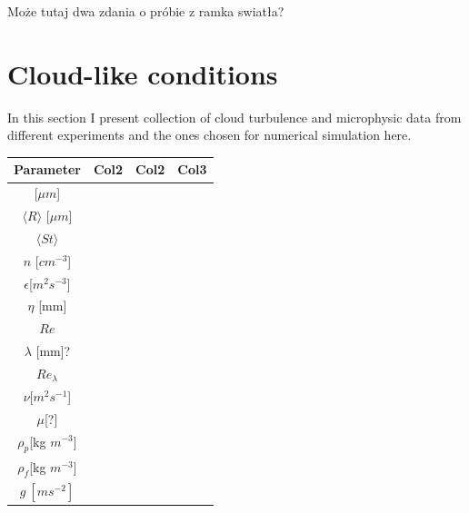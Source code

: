 \documentclass[../main.tex]{subfiles}
\begin{document}
Może tutaj dwa zdania o próbie z ramka swiatła?

\section{Cloud-like conditions}
\label{ch2s5}

In this section I present collection of cloud turbulence and microphysic data from different experiments and the ones chosen for numerical simulation here.

\begin{table}[h!]
\centering
 \begin{tabular}{||c| c| c| c||} 
 \hline
 Parameter & Col2 \citep{} & Col2\citep{} & Col3\citep{} \\ [0.5ex] 
 \hline\hline
  [$R_{min},R_{max}$][$\mu m$] &  &  &  \\ 
  $\langle R \rangle$ [$\mu m$]&  &  &  \\
  $\langle St\rangle$ &  &  &  \\
  $n$ [$cm^{-3}$] &  &  &  \\
  $\epsilon$[$m^2 s^{-3}$] &  &  &  \\
  $\eta$ [mm] &  &  &  \\
  $Re$ &  &  &  \\
  $\lambda$ [mm]? &  &  &  \\
  $Re_{\lambda}$        &  &  &  \\
  $\nu$[$m^2 s^{-1}$] &  &  &  \\
  $\mu$[?] &  &  &  \\
  $\rho_p$[kg $m^{-3}$] &  &  &  \\
  $\rho_f$[kg $m^{-3}$] &  &  &  \\
  $g \ [m s^{-2}]$ &  &  &  \\[1ex] 
 \hline
 \end{tabular}
 \label{tab:ch2_01}
\end{table}
 
\end{document}
